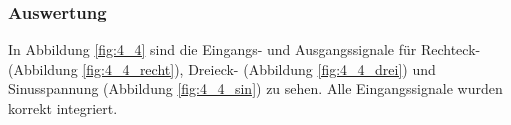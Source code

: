 \documentclass[12pt,a4paper]{article}
\begin{document}
\subsubsection{Auswertung}

In Abbildung \ref{fig:4_4} sind die Eingangs- und Ausgangssignale für Rechteck- (Abbildung \ref{fig:4_4_recht}), Dreieck- (Abbildung \ref{fig:4_4_drei}) und Sinusspannung (Abbildung \ref{fig:4_4_sin}) zu sehen. Alle Eingangssignale wurden korrekt integriert.
\end{document}
